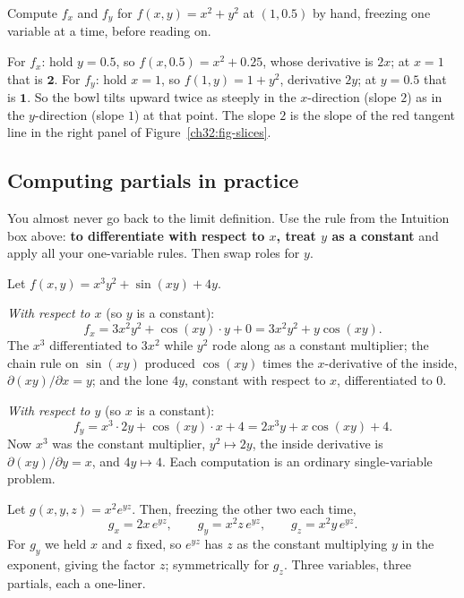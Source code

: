 \begin{labbox}
Compute $f_x$ and $f_y$ for $f(x,y)=x^2+y^2$ at $(1,0.5)$ by hand, freezing one variable at a
time, before reading on.

For $f_x$: hold $y=0.5$, so $f(x,0.5)=x^2+0.25$, whose derivative is $2x$; at $x=1$ that is
$\mathbf{2}$. For $f_y$: hold $x=1$, so $f(1,y)=1+y^2$, derivative $2y$; at $y=0.5$ that is
$\mathbf{1}$. So the bowl tilts upward twice as steeply in the $x$-direction (slope $2$) as in
the $y$-direction (slope $1$) at that point. The slope $2$ is the slope of the red tangent line
in the right panel of Figure~\ref{ch32:fig-slices}.
\end{labbox}

\subsection*{Computing partials in practice}

You almost never go back to the limit definition. Use the rule from the Intuition box above:
\textbf{to differentiate with respect to $x$, treat $y$ as a constant} and apply all
your one-variable rules. Then swap roles for $y$.

\begin{example}
\label{ch32:ex-compute}
Let $f(x,y) = x^3 y^2 + \sin(xy) + 4y$.

\emph{With respect to $x$} (so $y$ is a constant):
\[
   f_x = 3x^2 y^2 + \cos(xy)\cdot y + 0 = 3x^2 y^2 + y\cos(xy).
\]
The $x^3$ differentiated to $3x^2$ while $y^2$ rode along as a constant multiplier; the chain
rule on $\sin(xy)$ produced $\cos(xy)$ times the $x$-derivative of the inside,
$\partial(xy)/\partial x = y$; and the lone $4y$, constant with respect to $x$, differentiated to $0$.

\emph{With respect to $y$} (so $x$ is a constant):
\[
   f_y = x^3\cdot 2y + \cos(xy)\cdot x + 4 = 2x^3 y + x\cos(xy) + 4.
\]
Now $x^3$ was the constant multiplier, $y^2 \mapsto 2y$, the inside derivative is
$\partial(xy)/\partial y = x$, and $4y \mapsto 4$. Each computation is an
ordinary single-variable problem.
\end{example}

\begin{example}
\label{ch32:ex-three}
Let $g(x,y,z) = x^2 e^{yz}$. Then, freezing the other two each time,
\[
   g_x = 2x\,e^{yz}, \qquad
   g_y = x^2 z\,e^{yz}, \qquad
   g_z = x^2 y\,e^{yz}.
\]
For $g_y$ we held $x$ and $z$ fixed, so $e^{yz}$ has $z$ as the constant multiplying $y$ in the
exponent, giving the factor $z$; symmetrically for $g_z$. Three variables, three partials, each
a one-liner.
\end{example}

